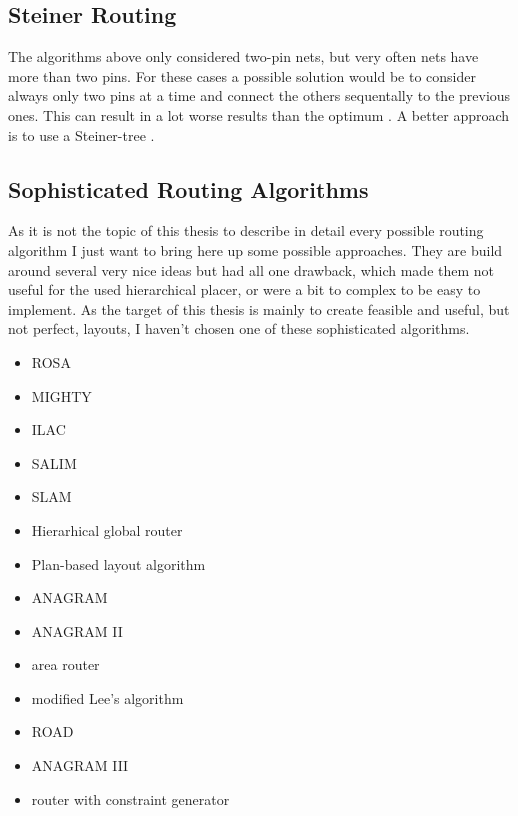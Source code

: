 \subsection{Steiner Routing}
The algorithms above only considered two-pin nets, but very often nets have more than two pins. For these cases a possible solution would be to consider always only two pins at a time and connect the others sequentally to the previous ones. This can result in a lot worse results than the optimum \cite[p. 701]{kaufmann:electronic_design_automation}. A better approach is to use a Steiner-tree \cite[page 153]{springer:eda_analog_routing}.

\subsection{Sophisticated Routing Algorithms}
As it is not the topic of this thesis to describe in detail every possible routing algorithm I just want to bring here up some possible approaches. They are build around several very nice ideas but had all one drawback, which made them not useful for the used hierarchical placer, or were a bit to complex to be easy to implement. As the target of this thesis is mainly to create feasible and useful, but not perfect, layouts, I haven't chosen one of these sophisticated algorithms.
\begin{itemize}
\item ROSA \cite[page 165]{springer:eda_analog_routing}
\item MIGHTY \cite[page 166]{springer:eda_analog_routing}
\item ILAC \cite[page 167]{springer:eda_analog_routing}
\item SALIM \cite[page 167]{springer:eda_analog_routing}
\item SLAM \cite[page 167]{springer:eda_analog_routing}
\item Hierarhical global router \cite[page 168]{springer:eda_analog_routing}
\item Plan-based layout algorithm \cite[page 168]{springer:eda_analog_routing}
\item ANAGRAM \cite[page 168]{springer:eda_analog_routing}
\item ANAGRAM II \cite[page 168]{springer:eda_analog_routing}
\item area router \cite[page 168]{springer:eda_analog_routing}
\item modified Lee's algorithm \cite[page 170]{springer:eda_analog_routing}
\item ROAD \cite[page 170]{springer:eda_analog_routing}
\item ANAGRAM III \cite[page 170]{springer:eda_analog_routing}
\item router with constraint generator \cite[page 172]{springer:eda_analog_routing}
\end{itemize}

